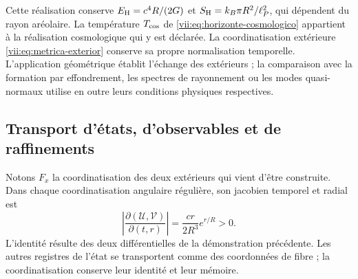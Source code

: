 Cette réalisation conserve \(E_{\rm H}=c^4R/(2G)\) et \(S_{\rm H}=k_B\pi R^2/\ell_P^2\), qui dépendent du rayon aréolaire. La température \(T_{\rm cos}\) de \eqref{vii:eq:horizonte-cosmologico} appartient à la réalisation cosmologique qui y est déclarée. La coordinatisation extérieure \eqref{vii:eq:metrica-exterior} conserve sa propre normalisation temporelle. L'application géométrique établit l'échange des extérieurs ; la comparaison avec la formation par effondrement, les spectres de rayonnement ou les modes quasi-normaux utilise en outre leurs conditions physiques respectives.

\subsection{Transport d'états, d'observables et de raffinements}
\label{vii:subsec:transporte-informacion-horizonte}

Notons \(F_x\) la coordinatisation des deux extérieurs qui vient d'être construite. Dans chaque coordinatisation angulaire régulière, son jacobien temporel et radial est
\begin{equation}
 \left|\frac{\partial(\mathcal U,\mathcal V)}{\partial(t,r)}\right|
 =\frac{cr}{2R^3}e^{r/R}>0.
 \label{vii:eq:jacobiano-kruskal}
\end{equation}
L'identité résulte des deux différentielles de la démonstration précédente. Les autres registres de l'état se transportent comme des coordonnées de fibre ; la coordinatisation conserve leur identité et leur mémoire.

